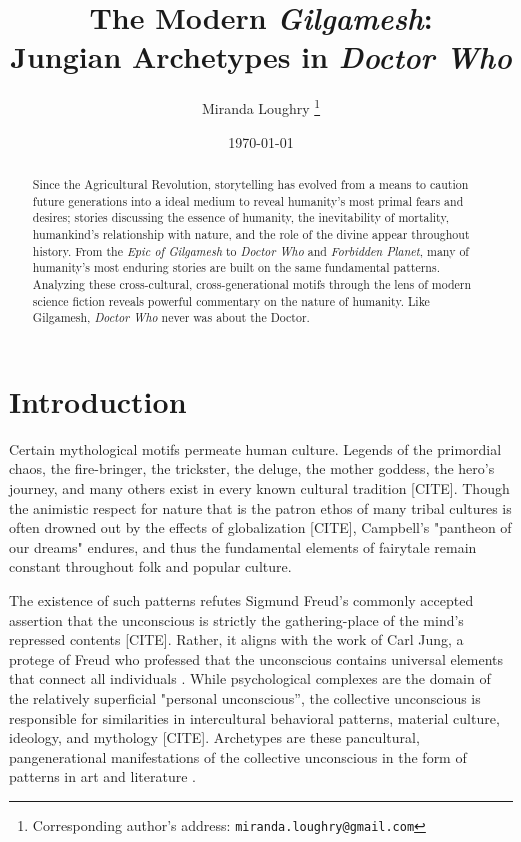 \documentclass[10pt,a4paper]{article}
\begin{document}
\title{The Modern \emph{Gilgamesh}: \\
Jungian Archetypes in \emph{Doctor Who}}

\author{Miranda Loughry%
\thanks{Corresponding author's address: \texttt{miranda.loughry@gmail.com}}}

\date{\today}

\maketitle

\begin{abstract}
Since the Agricultural Revolution, storytelling has evolved from a means to caution future generations into a ideal medium to reveal humanity's most primal fears and desires; stories discussing the essence of humanity, the inevitability of mortality, humankind's relationship with nature, and the role of the divine appear throughout history. From the \emph{Epic of Gilgamesh} to \emph{Doctor Who} and \emph{Forbidden Planet}, many of humanity's most enduring stories are built on the same fundamental patterns. Analyzing these cross-cultural, cross-generational motifs through the lens of modern science fiction reveals powerful commentary on the nature of humanity. Like Gilgamesh, \emph{Doctor Who} never was about the Doctor.
\end{abstract}

\section{Introduction}
%
%

Certain mythological motifs permeate human culture. Legends of the primordial chaos, the fire-bringer, the trickster, the deluge, the mother goddess, the hero’s journey, and many others exist in every known cultural tradition [CITE]. Though the animistic respect for nature that is the patron ethos of many tribal cultures is often drowned out by the effects of globalization [CITE], Campbell's "pantheon of our dreams" \cite{campbell2008hero} endures, and thus the fundamental elements of fairytale remain constant throughout folk and popular culture.

The existence of such patterns refutes Sigmund Freud’s commonly accepted assertion that the unconscious is strictly the gathering-place of the mind’s repressed contents [CITE]. Rather, it aligns with the work of Carl Jung, a protege of Freud who professed that the unconscious contains universal elements that connect all individuals \cite{jung2014archetypes}. While psychological complexes are the domain of the relatively superficial "personal unconscious”, the collective unconscious is responsible for similarities in intercultural behavioral patterns, material culture, ideology, and mythology [CITE]. Archetypes are these pancultural, pangenerational manifestations of the collective unconscious in the form of patterns in art and literature  \cite{jung2014archetypes}.
\end{document}
